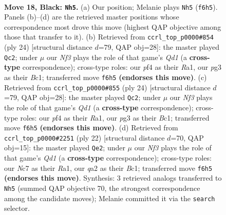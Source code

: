 \documentclass[11pt]{article}
\begin{document}
\clearpage

\begin{figure}[p]\centering
\begin{subfigure}{0.46\textwidth}\centering
\resizebox{\linewidth}{!}{%
\newchessgame
\chessboard[
  setfen={1rbq1r1k/p1n1b2p/1pp2np1/3p1p2/3P1P2/PP3NP1/Q2NP1BP/R1B1R1K1 b - - 0 18},
  showmover=false,
  pgfstyle=straightmove, color=movearrow, markmove={f6-h5}
]}
\caption{}
\end{subfigure}\hfill
\begin{subfigure}{0.46\textwidth}\centering
\resizebox{\linewidth}{!}{%
\newchessgame
\chessboard[
  setfen={r1bqr1k1/3nbppp/p2p1n2/1ppP4/4P3/1PNB1N1P/P4PP1/R1BQ1RK1 w - - 1 13},
  showmover=false,
  pgfstyle=straightmove, color=movearrow, markmove={d1-c2}
]}
\caption{}
\end{subfigure}
\\[4pt]
\begin{subfigure}{0.46\textwidth}\centering
\resizebox{\linewidth}{!}{%
\newchessgame
\chessboard[
  setfen={r1bqr1k1/3nbppp/p2p1n2/1ppP4/4P3/1PNB1N1P/P4PP1/R1BQ1RK1 w - - 1 13},
  showmover=false,
  pgfstyle=straightmove, color=movearrow, markmove={d1-c2}
]}
\caption{}
\end{subfigure}\hfill
\begin{subfigure}{0.46\textwidth}\centering
\resizebox{\linewidth}{!}{%
\newchessgame
\chessboard[
  setfen={r2q1rk1/pp1b2pp/2nbpn2/2pp4/5P2/N1PP1NP1/PP4BP/R1BQ1RK1 w - - 5 12},
  showmover=false,
  pgfstyle=straightmove, color=movearrow, markmove={d1-e2}
]}
\caption{}
\end{subfigure}
\caption{\textbf{Move 18, Black: \texttt{Nh5}.} (a) Our position; Melanie plays \texttt{Nh5} (\texttt{f6h5}). Panels (b)--(d) are the retrieved master positions whose correspondence most drove this move (highest QAP objective among those that transfer to it). (b) Retrieved from \texttt{ccrl\_top\_p0000\#854} (ply 24) [structural distance $d$=79, QAP obj=28]: the master played \texttt{Qc2}; under $\mu$ our \emph{Nf3} plays the role of that game's \emph{Qd1} (a \textbf{cross-type} correspondence); cross-type roles: our \emph{p}f4 as their \emph{R}a1, our \emph{p}g3 as their \emph{B}c1; transferred move \texttt{f6h5} \textbf{(endorses this move)}. (c) Retrieved from \texttt{ccrl\_top\_p0000\#855} (ply 24) [structural distance $d$=79, QAP obj=28]: the master played \texttt{Qc2}; under $\mu$ our \emph{Nf3} plays the role of that game's \emph{Qd1} (a \textbf{cross-type} correspondence); cross-type roles: our \emph{p}f4 as their \emph{R}a1, our \emph{p}g3 as their \emph{B}c1; transferred move \texttt{f6h5} \textbf{(endorses this move)}. (d) Retrieved from \texttt{ccrl\_top\_p0000\#2251} (ply 22) [structural distance $d$=70, QAP obj=15]: the master played \texttt{Qe2}; under $\mu$ our \emph{Nf3} plays the role of that game's \emph{Qd1} (a \textbf{cross-type} correspondence); cross-type roles: our \emph{N}c7 as their \emph{R}a1, our \emph{q}a2 as their \emph{B}c1; transferred move \texttt{f6h5} \textbf{(endorses this move)}. Synthesis: 3 retrieved analogs transferred to \texttt{Nh5} (summed QAP objective 70, the strongest correspondence among the candidate moves); Melanie committed it via the \texttt{search} selector.}

\end{figure}
\end{document}

